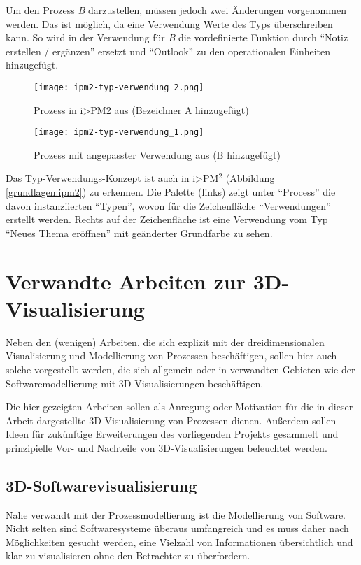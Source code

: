 \documentclass[a4paper,10pt]{sphinxmanual}
\begin{document}
Um den Prozess \emph{B} darzustellen, müssen jedoch zwei Änderungen vorgenommen werden.
Das ist möglich, da eine Verwendung Werte des Typs überschreiben kann.
So wird in der Verwendung für \emph{B} die vordefinierte Funktion durch "`Notiz erstellen / ergänzen"' ersetzt und "`Outlook"' zu den operationalen Einheiten hinzugefügt.
\begin{figure}[htbp]
\centering
\capstart

\texttt{[image: ipm2-typ-verwendung\_2.png]}
\caption{Prozess in i\textgreater{}PM2 aus \cite{volz_werkzeugunterstutzung_2011} (Bezeichner A hinzugefügt)}\label{grundlagen:ipm-typ-verwendung-1}\end{figure}
\begin{figure}[htbp]
\centering
\capstart

\texttt{[image: ipm2-typ-verwendung\_1.png]}
\caption{Prozess mit angepasster Verwendung aus \cite{volz_werkzeugunterstutzung_2011} (B hinzugefügt)}\label{grundlagen:ipm-typ-verwendung-2}\end{figure}

Das Typ-Verwendungs-Konzept ist auch in i\textgreater{}PM$^{\text{2}}$ (\hyperref[grundlagen:ipm2]{Abbildung  \ref*{grundlagen:ipm2}}) zu erkennen.
Die Palette (links) zeigt unter "`Process"' die davon instanziierten "`Typen"', wovon für die Zeichenfläche "`Verwendungen"' erstellt werden.
Rechts auf der Zeichenfläche ist eine Verwendung vom Typ "`Neues Thema eröffnen"' mit geänderter Grundfarbe zu sehen.


\chapter{Verwandte Arbeiten zur 3D-Visualisierung}
\label{related:verwandte-arbeiten-zur-3d-visualisierung}\label{related::doc}\label{related:related}
Neben den (wenigen) Arbeiten, die sich explizit mit der dreidimensionalen Visualisierung und Modellierung von Prozessen beschäftigen, sollen hier auch solche vorgestellt werden, die sich allgemein oder in verwandten Gebieten wie der Softwaremodellierung mit 3D-Visualisierungen beschäftigen.

Die hier gezeigten Arbeiten sollen als Anregung oder Motivation für die in dieser Arbeit dargestellte 3D-Visualisierung von Prozessen dienen.
Außerdem sollen Ideen für zukünftige Erweiterungen des vorliegenden Projekts gesammelt und prinzipielle Vor- und Nachteile von 3D-Visualisierungen beleuchtet werden.


\section{3D-Softwarevisualisierung}
\label{related:d-softwarevisualisierung}
Nahe verwandt mit der Prozessmodellierung ist die Modellierung von Software.
Nicht selten sind Softwaresysteme überaus umfangreich und es muss daher nach Möglichkeiten gesucht werden, eine Vielzahl von Informationen übersichtlich und klar zu visualisieren ohne den Betrachter zu überfordern.
\end{document}
